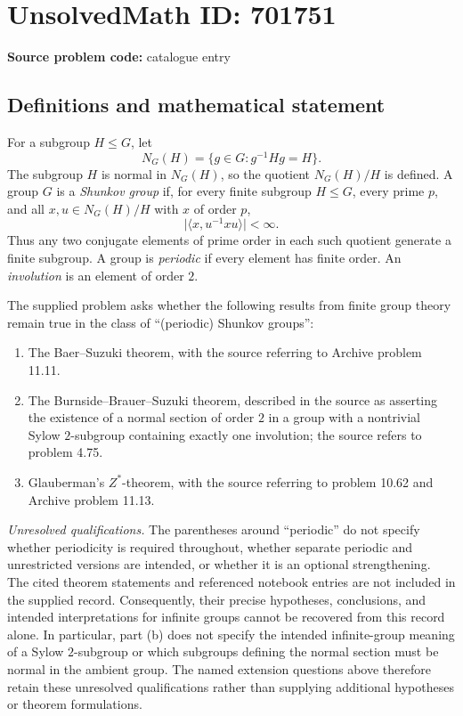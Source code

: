 \documentclass[11pt]{article}
\begin{document}
\section*{UnsolvedMath ID: 701751}
\textbf{Source problem code:} catalogue entry
\subsection{Definitions and mathematical statement}
For a subgroup \(H\leq G\), let
\[
N_G(H)=\{g\in G:g^{-1}Hg=H\}.
\]
The subgroup \(H\) is normal in \(N_G(H)\), so the quotient \(N_G(H)/H\) is defined. A group \(G\) is a \emph{Shunkov group} if, for every finite subgroup \(H\leq G\), every prime \(p\), and all \(x,u\in N_G(H)/H\) with \(x\) of order \(p\),
\[
\bigl|\langle x,u^{-1}xu\rangle\bigr|<\infty.
\]
Thus any two conjugate elements of prime order in each such quotient generate a finite subgroup. A group is \emph{periodic} if every element has finite order. An \emph{involution} is an element of order \(2\).

The supplied problem asks whether the following results from finite group theory remain true in the class of ``(periodic) Shunkov groups'':
\begin{enumerate}
\item[(a)] The Baer--Suzuki theorem, with the source referring to Archive problem 11.11.
\item[(b)] The Burnside--Brauer--Suzuki theorem, described in the source as asserting the existence of a normal section of order \(2\) in a group with a nontrivial Sylow \(2\)-subgroup containing exactly one involution; the source refers to problem 4.75.
\item[(c)] Glauberman's \(Z^*\)-theorem, with the source referring to problem 10.62 and Archive problem 11.13.
\end{enumerate}

\emph{Unresolved qualifications.} The parentheses around ``periodic'' do not specify whether periodicity is required throughout, whether separate periodic and unrestricted versions are intended, or whether it is an optional strengthening. The cited theorem statements and referenced notebook entries are not included in the supplied record. Consequently, their precise hypotheses, conclusions, and intended interpretations for infinite groups cannot be recovered from this record alone. In particular, part (b) does not specify the intended infinite-group meaning of a Sylow \(2\)-subgroup or which subgroups defining the normal section must be normal in the ambient group. The named extension questions above therefore retain these unresolved qualifications rather than supplying additional hypotheses or theorem formulations.
\end{document}
